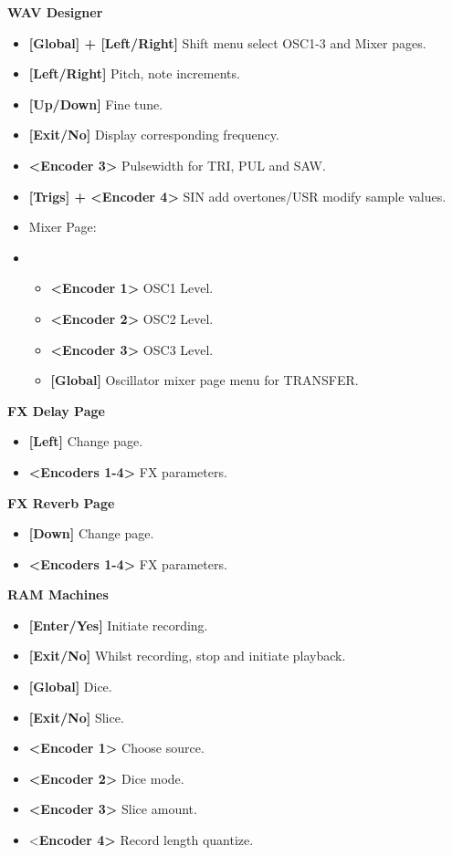 \textbf{WAV Designer} 
\begin{itemize}

     \item \textbf{[Global] + [Left/Right] }Shift menu select OSC1-3 and Mixer pages.
     \item \textbf{[Left/Right]} Pitch, note increments.
     \item \textbf{[Up/Down]} Fine tune.
     \item \textbf{[Exit/No] }Display corresponding frequency.
     \item \textbf{<Encoder 3>} Pulsewidth for TRI, PUL and SAW.
     \item \textbf{[Trigs] + <Encoder 4>} SIN add overtones/USR modify sample values.
     \item Mixer Page:
     \item \begin{itemize}
         \item \textbf{<Encoder 1>} OSC1 Level.
         \item \textbf{<Encoder 2>} OSC2 Level.
         \item \textbf{<Encoder 3>} OSC3 Level.
         \item \textbf{[Global]} Oscillator mixer page menu for TRANSFER.
     \end{itemize}
     \end{itemize}
     \textbf{FX Delay Page} 
\begin{itemize}

     \item \textbf{[Left] }Change page.
     \item \textbf{<Encoders 1-4>} FX parameters.
     \end{itemize}
       \textbf{FX Reverb Page} 
\begin{itemize}

     \item \textbf{[Down] }Change page.
     \item \textbf{<Encoders 1-4>} FX parameters.
     \end{itemize}
    \textbf{RAM Machines}
\begin{itemize}

     \item \textbf{[Enter/Yes]} Initiate recording.
     \item \textbf{[Exit/No]} Whilst recording, stop and initiate playback.
     \item \textbf{[Global]} Dice.
     \item \textbf{[Exit/No]} Slice.
     \item \textbf{<Encoder 1>} Choose source.
     \item \textbf{<Encoder 2>} Dice mode.
     \item \textbf{<Encoder 3>} Slice amount.
     \item <\textbf{Encoder 4>} Record length quantize.
     \end{itemize}
   

\newpage
